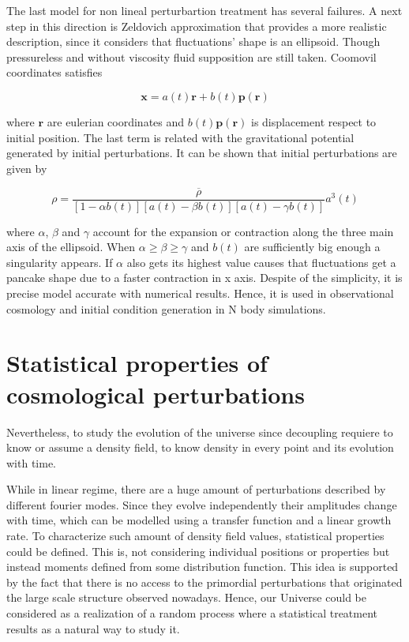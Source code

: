 The last model for non lineal perturbartion treatment 
has several failures. A next step in this direction is 
Zeldovich approximation that provides a more realistic description, 
since it considers that fluctuations' shape is an ellipsoid.
Though pressureless and without viscosity fluid supposition are still taken.
Coomovil coordinates satisfies 

\[
\textbf{x} = a(t)\textbf{r}+b(t)\textbf{p}(\textbf{r})
\]

where $\textbf{r}$ are eulerian coordinates and $b(t)\textbf{p}(\textbf{r})$
is displacement respect to initial position. The last term is related 
with the gravitational potential generated by initial perturbations. 
It can be shown that initial perturbations are given by 

\[
\rho = \frac{\overline{\rho} }{[1-\alpha b(t)][a(t)-\beta b(t)][a(t)-\gamma b(t)]}a^3(t)
\]

where $\alpha$, $\beta$ and $\gamma$ account for the expansion or contraction 
along the three main axis of the ellipsoid. 
When  $\alpha \geq \beta \geq \gamma$ and $b(t)$ are sufficiently big enough a 
singularity appears. If $\alpha$ also gets its highest value causes that fluctuations
get a pancake shape due to a faster contraction in x axis. 
Despite of the simplicity, it is precise model accurate with numerical results. Hence,
it is used in observational cosmology and initial condition generation in N body
simulations. 

\section{ Statistical properties of cosmological perturbations }

Nevertheless, to study the evolution of the universe since decoupling requiere to know 
or assume a density field, to know density in every point and its evolution with time.  

While in linear regime, there are a huge amount of perturbations described by different 
fourier modes. Since they evolve independently their amplitudes change with time, which 
can be modelled using a transfer function and a linear growth rate. To characterize
such amount of density field values, statistical properties could be defined. This is,
not considering individual positions or properties but instead moments defined from
some distribution function. This idea is supported by the fact that there is no access 
to the primordial perturbations that originated the large scale structure observed 
nowadays. Hence, our Universe could be considered as a realization of a random process 
where a statistical treatment results as a natural way to study it. 


